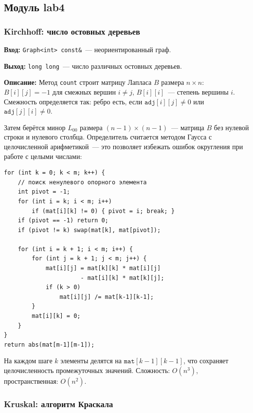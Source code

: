 \subsection{Модуль lab4}

\subsubsection{Kirchhoff: число остовных деревьев}

\textbf{Вход:} \texttt{Graph<int> const\&}~--- неориентированный граф.

\textbf{Выход:} \texttt{long long}~--- число различных остовных деревьев.

\textbf{Описание:} Метод \texttt{count} строит матрицу Лапласа $B$
размера $n \times n$: $B[i][j] = -1$ для смежных вершин $i \neq j$,
$B[i][i]$~--- степень вершины $i$. Смежность определяется так:
ребро есть, если $\texttt{adj}[i][j] \neq 0$ или $\texttt{adj}[j][i] \neq 0$.

Затем берётся минор $L_{00}$ размера $(n-1) \times (n-1)$~--- матрица $B$
без нулевой строки и нулевого столбца. Определитель считается методом
Гаусса с целочисленной арифметикой~--- это позволяет избежать ошибок
округления при работе с целыми числами:

\begin{lstlisting}[style=cstyle, caption={Метод Гаусса с целочисленной арифметикой (kirchhoff.cpp)}]
for (int k = 0; k < m; k++) {
    // поиск ненулевого опорного элемента
    int pivot = -1;
    for (int i = k; i < m; i++)
        if (mat[i][k] != 0) { pivot = i; break; }
    if (pivot == -1) return 0;
    if (pivot != k) swap(mat[k], mat[pivot]);

    for (int i = k + 1; i < m; i++) {
        for (int j = k + 1; j < m; j++) {
            mat[i][j] = mat[k][k] * mat[i][j]
                      - mat[i][k] * mat[k][j];
            if (k > 0)
                mat[i][j] /= mat[k-1][k-1];
        }
        mat[i][k] = 0;
    }
}
return abs(mat[m-1][m-1]);
\end{lstlisting}

На каждом шаге $k$ элементы делятся на $\texttt{mat}[k-1][k-1]$,
что сохраняет целочисленность промежуточных значений.
Сложность: $O(n^3)$, пространственная: $O(n^2)$.

\subsubsection{Kruskal: алгоритм Краскала}

